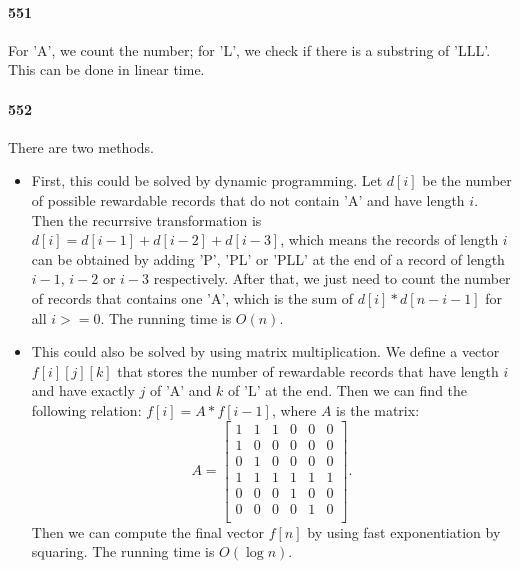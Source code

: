 \documentclass[11pt]{article}
\begin{document}
\begin{itemize}
\paragraph{551}
For 'A', we count the number; for 'L', we check if there is a substring of 'LLL'. This can be done in linear time.

\paragraph{552}
There are two methods.
\begin{itemize}
\item First, this could be solved by dynamic programming. Let $d[i]$ be the number of possible rewardable records that do not contain 'A' and
have length $i$. Then the recurrsive transformation is $d[i] = d[i-1] + d[i-2] + d[i-3]$, which means the records of length $i$
can be obtained by adding 'P', 'PL' or 'PLL' at the end of a record of length $i-1$, $i-2$ or $i-3$ respectively.
After that, we just need to count the number of records that contains one 'A', which is the sum of $d[i] * d[n-i-1]$ for all
$i>=0$. The running time is $O(n)$. 

\item This could also be solved by using matrix multiplication. We define a vector $f[i][j][k]$ that stores the number of 
rewardable records that have length $i$ and have exactly $j$ of 'A' and $k$ of 'L' at the end. Then we can find the following
relation: $f[i] = A * f[i-1]$, where $A$ is the matrix:
\[A=\left[ 
\begin{array}{cccccc}
1 & 1 & 1 & 0 & 0 & 0 \\ 
1 & 0 & 0 & 0 & 0 & 0 \\ 
0 & 1 & 0 & 0 & 0 & 0 \\
1 & 1 & 1 & 1 & 1 & 1 \\
0 & 0 & 0 & 1 & 0 & 0 \\
0 & 0 & 0 & 0 & 1 & 0 \\
\end{array} \right]. \]
Then we can compute the final vector $f[n]$ by using fast exponentiation by squaring. The running time is $O(\log n)$.
\end{itemize}



\end{itemize}
\end{document}
